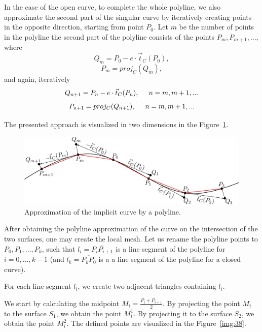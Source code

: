 In the case of the open curve, to complete the whole polyline, we also approximate 
the second part of the singular curve by iteratively creating points in the 
opposite direction, starting from point $P_0$. Let $m$ be the number of points
in the polyline the second part of the polyline consists of the points
$P_m, P_{m+1}, ...$, where
$$Q_m = P_0 - e \cdot \vec{t}_C(P_0),$$
$$P_m = proj_C(Q_m),$$
and again, iteratively
$$Q_{n+1} = P_n - e \cdot \vec{t}_C(P_{n}), \hspace{5mm} n = m, m+1, ...$$
$$P_{n+1} = proj_C(Q_{n+1}), \hspace{5mm} n = m, m+1, ...$$

The presented approach is visualized in two dimensions in the Figure~\ref{img:37}.

\begin{figure}
    \centerline{\includegraphics[scale=0.5]{images/img37}}
    \caption[Approximation of the implicit curve by polyline]
    {Approximation of the implicit curve by a polyline.}
    \label{img:37}
\end{figure}

After obtaining the polyline approximation of the curve on the intersection
of the two surfaces, one may create the local mesh. Let us rename the polyline 
points to $P_0, P_1, ..., P_k$, such that $l_i = \overline{P_i P_{i+1}}$ is a 
line segment of the polyline for $i=0, ..., k-1$ (and $l_k = \overline{P_k P_0}$ is a 
a line segment of the polyline for a closed curve).

For each line segment $l_i$, we create two adjacent triangles containing $l_i$.

We start by calculating the midpoint $M_i = \frac{P_i+P_{i+1}}{2}$.
By projecting the point $M_i$ to the surface $S_1$, we obtain the point $M_i^1$.
By projecting it to the surface $S_2$, we obtain the point $M_i^2$. The defined points
are visualized in the Figure~\ref{img:38}.

